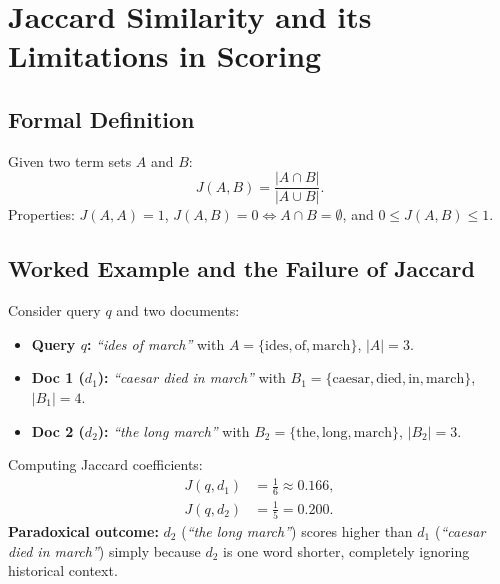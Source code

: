 \FloatBarrier
\section{Jaccard Similarity and its Limitations in Scoring}
\label{sec:jaccard-scoring-en}

\subsection{Formal Definition}
\begin{definition}
Given two term sets $A$ and $B$:
\begin{equation}
J(A, B) = \frac{|A \cap B|}{|A \cup B|}.
\end{equation}
Properties: $J(A, A) = 1$, $J(A, B) = 0 \iff A \cap B = \emptyset$, and $0 \le J(A, B) \le 1$.
\end{definition}

\subsection{Worked Example and the Failure of Jaccard}

\begin{example}
Consider query $q$ and two documents:
\begin{itemize}
    \item \textbf{Query $q$:} \textit{``ides of march''} with $A = \{\text{ides}, \text{of}, \text{march}\}$, $|A| = 3$.
    \item \textbf{Doc 1 ($d_1$):} \textit{``caesar died in march''} with $B_1 = \{\text{caesar}, \text{died}, \text{in}, \text{march}\}$, $|B_1| = 4$.
    \item \textbf{Doc 2 ($d_2$):} \textit{``the long march''} with $B_2 = \{\text{the}, \text{long}, \text{march}\}$, $|B_2| = 3$.
\end{itemize}

Computing Jaccard coefficients:
\begin{align*}
J(q, d_1) &= \frac{1}{6} \approx 0.166, \\
J(q, d_2) &= \frac{1}{5} = 0.200.
\end{align*}
\textbf{Paradoxical outcome:} $d_2$ (\textit{``the long march''}) scores higher than $d_1$ (\textit{``caesar died in march''}) simply because $d_2$ is one word shorter, completely ignoring historical context.
\end{example}

